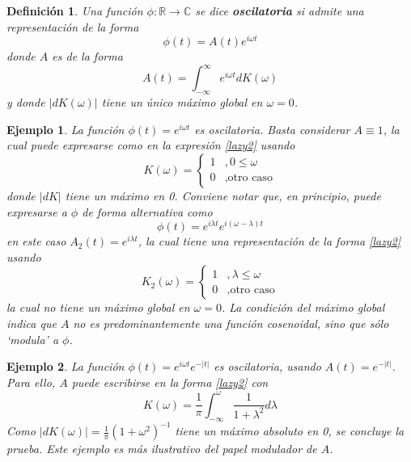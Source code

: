 \documentclass[12pt,letterpaper]{book}
\newtheorem{definicion}{Definición}[chapter]
\newtheorem{ejemplo}{Ejemplo}[chapter]
\newcommand{\R}{\mathbb{R}}
\newcommand{\C}{\mathbb{C}}
\newcommand{\intR}{\int_{-\infty}^{\infty}}
\newcommand{\abso}[1]{\left| #1 \right|}
\begin{document}
\begin{definicion}
Una función $\phi: \R \rightarrow \C$ se dice \textbf{oscilatoria} si admite una representación de la forma
\begin{equation}
\phi(t) = A(t) e^{i \omega t} 
\end{equation}
donde $A$ es de la forma
\begin{equation}
A(t) = \intR e^{i \omega t} dK(\omega)
\label{lazy2}
\end{equation}
y donde $\abso{dK(\omega)}$ tiene un único máximo global en $\omega = 0$.
\label{oscilatorio}
\end{definicion}

\begin{ejemplo}
La función $\phi(t) = e^{i \omega t}$ es oscilatoria. 
%
Basta considerar $A \equiv 1$, la cual puede expresarse como en la expresión \ref{lazy2} usando \begin{equation}
K(\omega) = \begin{cases}
1 &, 0 \leq \omega \\
0 &, \text{otro caso}
\end{cases}
\end{equation}
donde $\abso{dK}$ tiene un máximo en 0. Conviene notar que, en principio, puede expresarse a $\phi$ de forma alternativa como
\begin{equation}
\phi(t) = e^{i \lambda t} e^{i (\omega-\lambda) t}
\end{equation} 
en este caso $A_2(t) = e^{i \lambda t}$, la cual tiene una representación de la forma \ref{lazy2} usando
\begin{equation}
K_2(\omega) = \begin{cases}
1 &, \lambda \leq \omega \\
0 &, \text{otro caso}
\end{cases}
\end{equation}
la cual no tiene un máximo global en $\omega=0$.
%
La condición del máximo global indica que $A$ no es \textit{predominantemente} una función cosenoidal, sino que sólo \textit{`modula'} a $\phi$.
\label{ejemplo:sen_cos_oscilatorios}
\end{ejemplo}

\begin{ejemplo}
La función $\phi(t) = e^{i \omega t} e^{-\abso{t}}$ es oscilatoria, usando $A(t) = e^{-\abso{t}}$.
% 
Para ello, $A$ puede escribirse en la forma \ref{lazy2} con 
\begin{equation}
K(\omega) = \frac{1}{\pi} \int_{-\infty}^{\omega}  \frac{1}{1+\lambda^2} d\lambda
\end{equation}
Como $\abso{dK(\omega)} = \frac{1}{\pi} \left( 1 + \omega^2 \right)^{-1}$ tiene un máximo absoluto en 0, se concluye la prueba. 
%
Este ejemplo es más ilustrativo del papel modulador de $A$.
\label{ejemplo:oscilatorios1}
\end{ejemplo}
\end{document}
